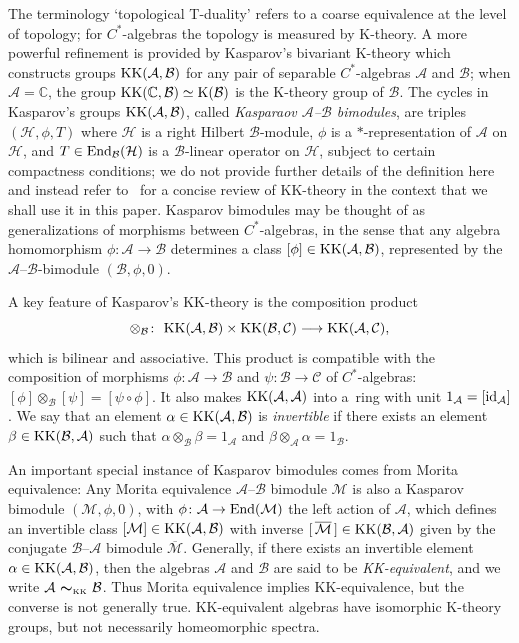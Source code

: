\documentclass[10pt,a4paper]{amsart}
\numberwithin{equation}{section}
\newcommand{\mbf}[1]{{\boldsymbol {#1} }}
\def\Id{{\rm id}}
\newcommand{\Ccal}{\mathcal{C}}
\newcommand{\End}{{\rm End}}
\newcommand{\complex}{{\mathbb C}} %
\def\alg{{\mathcal A}}
\def\balg{{\mathcal B}}
\def\hil{{\mathcal H}}
\def\Mcal{{\mathcal M}}
\begin{document}
The terminology `topological T-duality' refers to a coarse equivalence at
the level of topology; for $C^*$-algebras the topology is measured by
K-theory. A more powerful refinement is provided by Kasparov's bivariant
K-theory which constructs groups ${\rm KK}(\alg,\balg)$ for any pair
of separable $C^*$-algebras $\alg$ and $\balg$; when $\alg=\complex$,
the group ${\rm KK}(\complex,\balg)\simeq {\rm
 K}(\balg)$ is the K-theory group of $\balg$. The cycles in
Kasparov's groups ${\rm KK}(\alg,\balg)$, called \emph{Kasparaov
 $\alg$--$\balg$ bimodules}, are triples $(\hil,\phi,T)$ where $\hil$
is a right Hilbert $\balg$-module, $\phi$ is a $*$-representation of $\alg$
on $\hil$, and $T\in\End_\balg(\hil)$ is a $\balg$-linear operator on
$\hil$, subject to certain compactness conditions; we do not
provide further details of the definition here and instead refer to~\cite{Brodzki2006} for a
concise review of KK-theory in the context that we shall use it
in this paper. Kasparov bimodules may be thought of as generalizations
of morphisms between $C^*$-algebras, in the sense that any algebra homomorphism $\phi\colon \alg\to\balg$
determines a class $[\phi]\in{\rm KK}(\alg,\balg)$, represented by the
$\alg$--$\balg$-bimodule $(\balg,\phi,0)$.

A key feature of Kasparov's KK-theory is the composition product
\[
\otimes_\balg\colon \ {\rm KK}(\alg,\balg)\times{\rm
 KK}(\balg,\Ccal)\longrightarrow{\rm KK}(\alg,\Ccal) ,
\]
which is bilinear and associative. This product is compatible with the
composition of morphisms $\phi\colon \alg\to\balg$ and $\psi\colon \balg\to\Ccal$
of $C^*$-algebras: $[\phi]\otimes_\balg[\psi] = [\psi\circ\phi]$. It
also makes ${\rm KK}(\alg,\alg)$ into a~ring with unit
$1_\alg=[\Id_\alg]$. We say that an element $\alpha\in{\rm
 KK}(\alg,\balg)$ is \emph{invertible} if there exists an element
$\beta\in{\rm KK}(\balg,\alg)$ such that
$\alpha\otimes_\balg\beta=1_\alg$ and
$\beta\otimes_\alg\alpha=1_\balg$.

An important special instance of Kasparov
bimodules comes from Morita equivalence: Any Morita equivalence
$\alg$--$\balg$ bimodule $\Mcal$ is also a Kasparov bimodule
$(\Mcal,\phi,0)$, with $\phi\colon \alg\to\End(\Mcal)$ the left action of
$\alg$, which defines an invertible class $[\Mcal]\in{\rm
 KK}(\alg,\balg)$ with inverse $[\,\overline{\Mcal}\,]\in{\rm
 KK}(\balg,\alg)$ given by the conjugate $\balg$--$\alg$ bimodule
$\overline{\Mcal}$. Generally, if there exists an invertible element
$\alpha\in{\rm KK}(\alg,\balg)$, then the algebras $\alg$ and $\balg$
are said to be \emph{{KK}-equivalent}, and we write $\alg\
\mbf\sim_{\text{\tiny{KK}}}\ \balg$. Thus Morita equivalence implies
KK-equivalence, but the converse is not generally true. KK-equivalent algebras have isomorphic
K-theory groups, but not necessarily homeomorphic spectra.
\end{document}
